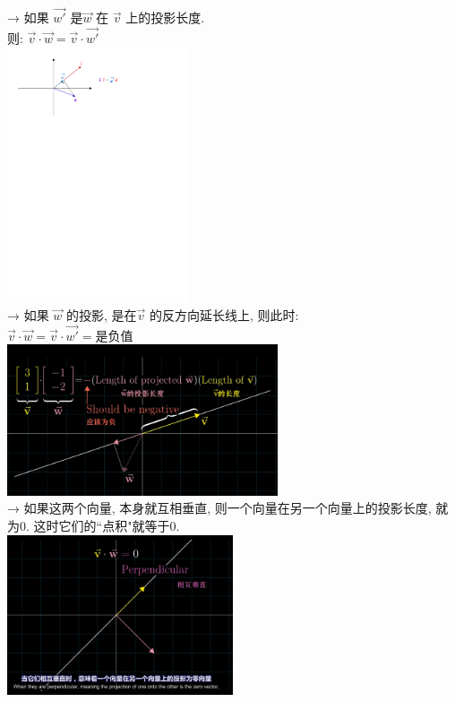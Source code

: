 \documentclass[UTF8]{ctexart}
\begin{document}
→ 如果 $\vec{w'}$ 是$\vec{w}$ 在 $\vec{v}$ 上的投影长度.\\
则:  $\vec{v} \cdot \vec{w} = \vec{v} \cdot \vec{w'}$\\
\includegraphics[width=0.4\textwidth]{img/0091.pdf}\\


→ 如果 $\vec{w}$ 的投影, 是在$\vec{v}$ 的反方向延长线上, 则此时:\\
$\vec{v} \cdot \vec{w} = \vec{v} \cdot \vec{w'} = \text{是负值}$\\
\includegraphics[width=0.6\textwidth]{img/0092.png}\\

→ 如果这两个向量, 本身就互相垂直, 则一个向量在另一个向量上的投影长度, 就为0. 这时它们的``点积"就等于0.\\
\includegraphics[width=0.5\textwidth]{img/0093.png}\\
\end{document}
